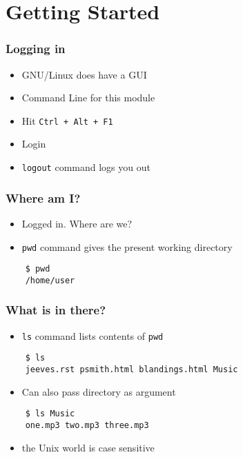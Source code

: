 \documentclass[12pt,compress]{beamer}
\begin{document}
\section{Getting Started} 
\begin{frame}[fragile]
  \frametitle{Logging in}
  \begin{itemize}
  \item GNU/Linux does have a GUI
  \item Command Line for this module
  \item Hit \texttt{Ctrl + Alt + F1}
  \item Login 
  \item \texttt{logout} command logs you out
  \end{itemize}
\end{frame}

\begin{frame}[fragile]
  \frametitle{Where am I?}
  \begin{itemize}
  \item Logged in. Where are we?
  \item \texttt{pwd} command gives the present working directory
  \end{itemize} 
  \begin{lstlisting}
    $ pwd
    /home/user
  \end{lstlisting} %
\end{frame}

\begin{frame}[fragile]
  \frametitle{What is in there?}
  \begin{itemize}
  \item \texttt{ls} command lists contents of \texttt{pwd}
  \end{itemize}
  \begin{lstlisting}
    $ ls
    jeeves.rst psmith.html blandings.html Music
  \end{lstlisting} %
  \begin{itemize}
  \item Can also pass directory as argument 
  \end{itemize}
  \begin{lstlisting}
    $ ls Music
    one.mp3 two.mp3 three.mp3
  \end{lstlisting} %
  \begin{itemize}
  \item   \alert{the Unix world is case sensitive}
  \end{itemize}
\end{frame}
\end{document}
